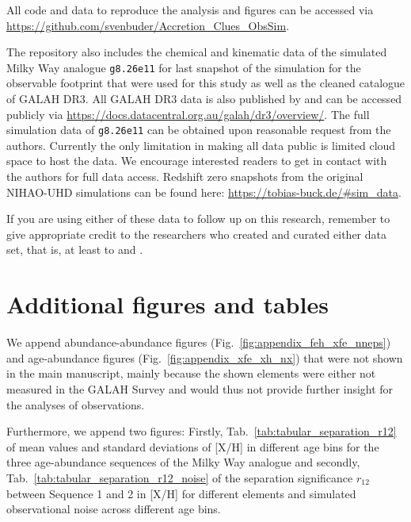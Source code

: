\documentclass[fleqn,usenatbib]{mnras}
\begin{document}
All code and data to reproduce the analysis and figures can be accessed via \url{https://github.com/svenbuder/Accretion_Clues_ObsSim}.

The repository also includes the chemical and kinematic data of the simulated Milky Way analogue \texttt{g8.26e11} for last snapshot of the simulation for the observable footprint that were used for this study as well as the cleaned catalogue of GALAH DR3. All GALAH DR3 data is also published by \citet{Buder2021} and can be accessed publicly via \url{https://docs.datacentral.org.au/galah/dr3/overview/}. The full simulation data of \texttt{g8.26e11} can be obtained upon reasonable request from the authors. Currently the only limitation in making all data public is limited cloud space to host the data. We encourage interested readers to get in contact with the authors for full data access. Redshift zero snapshots from the original NIHAO-UHD simulations can be found here: \url{https://tobias-buck.de/\#sim_data}.

If you are using either of these data to follow up on this research, remember to give appropriate credit to the researchers who created and curated either data set, that is, at least to \citet{Buder2021, Buder2022} and \citet{Buck2020b, Buck2021}.





\appendix

\section{Additional figures and tables} 

We append abundance-abundance figures (Fig.~\ref{fig:appendix_feh_xfe_nneps}) and age-abundance figures (Fig.~\ref{fig:appendix_xfe_xh_nx}) that were not shown in the main manuscript, mainly because the shown elements were either not measured in the GALAH Survey and would thus not provide further insight for the analyses of observations.

Furthermore, we append two figures: Firstly, Tab.~\ref{tab:tabular_separation_r12} of mean values and standard deviations of {[X/H]} in different age bins for the three age-abundance sequences of the Milky Way analogue and secondly, Tab.~\ref{tab:tabular_separation_r12_noise} of the separation significance $r_{12}$ between Sequence 1 and 2 in {[X/H]} for different elements and simulated observational noise across different age bins.
\end{document}
